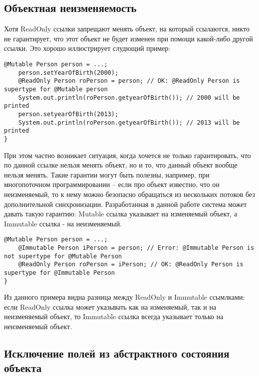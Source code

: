 \subsection{Объектная неизменяемость}

Хотя ReadOnly ссылки запрещают менять объект, на который ссылаются, никто не гарантирует, что этот объект не будет изменен при помощи какой-либо другой ссылки. Это хорошо иллюстрирует слудющий пример:

\begin{lstlisting}[caption=Изменение объекта\, хранимого по ReadOnly ссылке, label=code:change_ro_object]
	@Mutable Person person = ...;
	person.setYearOfBirth(2000);
	@ReadOnly Person roPerson = person; // OK: @ReadOnly Person is supertype for @Mutable person
	System.out.println(roPerson.getyearOfBirth()); // 2000 will be printed
	person.setyearOfBirth(2013);
	System.out.println(roPerson.getyearOfBirth()); // 2013 will be printed			
}
\end{lstlisting} 

При этом частно возникает ситуация, когда хочется не только гарантировать, что по данной ссылке нельзя менять объект, но и то, что данный объект вообще нельзя менять. Такие гарантии могут быть полезны, например, при многопоточном программировании -- если про объект известно, что он неизменяемый, то к нему можно безопасно обращаться из нескольких потоков без дополнительной синхронизации. Разработанная в данной работе система может давать такую гарантию: Mutable ссылка указывает на изменяемый объект, а Immutable ссылка - на неизменяемый. 

\begin{lstlisting}[caption=Mutable и Immutable ссылки, label=code:mutable_vs_immutable]
	@Mutable Person person = ...;
	@Immutable Person iPerson = person; // Error: @Immutable Person is not supertype for @Mutable Person
	@ReadOnly Person roPerson = iPerson; // OK: @ReadOnly Person is supertype for @Immutable Person
}
\end{lstlisting} 

Из данного примера видна разница между ReadOnly и Immutable ссымлками: если ReadOnly ссылка может указывать как на изменяемый, так и на неизменяемый объект, то Immutable ссылка всегда указывает только на неизменяемый объект.  

\subsection{Исключение полей из абстрактного состояния объекта}

